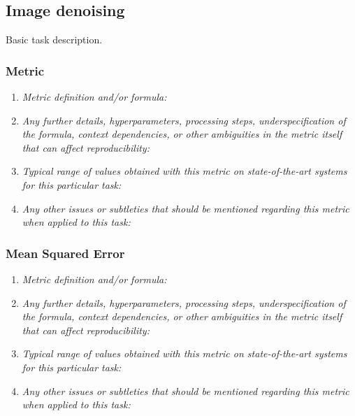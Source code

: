 \documentclass[a4paper,11pt]{article}
\begin{document}
    \subsection{Image denoising} \label{image_denoising}
        Basic task description.
        \subsubsection{Metric}
            \begin{enumerate}[label=\alph*.]
                \item \textit{Metric definition and/or formula:}
                \bigskip
                \item \textit{Any further details, hyperparameters, processing steps, underspecification of the formula, context dependencies, or other ambiguities in the metric itself that can affect reproducibility:}
                \bigskip
                \item \textit{Typical range of values obtained with this metric on state-of-the-art systems for this particular task:}
                \bigskip
                \item \textit{Any other issues or subtleties that should be mentioned regarding this metric when applied to this task:}
                \bigskip
            \end{enumerate}
        \subsubsection{Mean Squared Error}
            \begin{enumerate}[label=\alph*.]
                \item \textit{Metric definition and/or formula:}
                \bigskip
                \item \textit{Any further details, hyperparameters, processing steps, underspecification of the formula, context dependencies, or other ambiguities in the metric itself that can affect reproducibility:}
                \bigskip
                \item \textit{Typical range of values obtained with this metric on state-of-the-art systems for this particular task:}
                \bigskip
                \item \textit{Any other issues or subtleties that should be mentioned regarding this metric when applied to this task:}
                \bigskip
            \end{enumerate}
\end{document}
